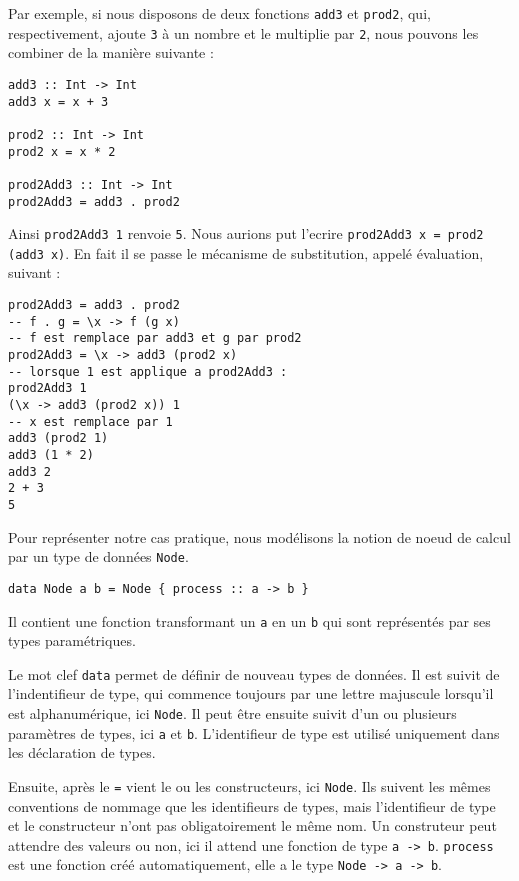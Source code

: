 \documentclass{llncs}
\begin{document}
Par exemple, si nous disposons de deux fonctions \lstinline{add3} et \lstinline{prod2},
qui, respectivement, ajoute \lstinline{3} à un nombre et le multiplie par \lstinline{2},
nous pouvons les combiner de la manière suivante :
\begin{lstlisting}
add3 :: Int -> Int
add3 x = x + 3

prod2 :: Int -> Int
prod2 x = x * 2

prod2Add3 :: Int -> Int
prod2Add3 = add3 . prod2
\end{lstlisting}

Ainsi \lstinline{prod2Add3 1} renvoie \lstinline{5}.
Nous aurions put l'ecrire \lstinline{prod2Add3 x = prod2 (add3 x)}.
En fait il se passe le mécanisme de substitution, appelé évaluation, suivant :
\begin{lstlisting}
prod2Add3 = add3 . prod2
-- f . g = \x -> f (g x)
-- f est remplace par add3 et g par prod2
prod2Add3 = \x -> add3 (prod2 x)
-- lorsque 1 est applique a prod2Add3 :
prod2Add3 1
(\x -> add3 (prod2 x)) 1
-- x est remplace par 1
add3 (prod2 1)
add3 (1 * 2)
add3 2
2 + 3
5
\end{lstlisting}

Pour représenter notre cas pratique, nous modélisons la notion de noeud de calcul
par un type de données \lstinline{Node}.
\begin{lstlisting}
data Node a b = Node { process :: a -> b }
\end{lstlisting}

Il contient une fonction transformant un \lstinline{a} en un \lstinline{b} qui
sont représentés par ses types paramétriques.

Le mot clef \lstinline{data} permet de définir de nouveau types de données.
Il est suivit de l'indentifieur de type, qui commence toujours par une lettre
majuscule lorsqu'il est alphanumérique, ici \lstinline{Node}.
Il peut être ensuite suivit d'un ou plusieurs paramètres de types, ici
\lstinline{a} et \lstinline{b}.
L'identifieur de type est utilisé uniquement dans les déclaration de types.

Ensuite, après le \lstinline{=} vient le ou les constructeurs, ici \lstinline{Node}.
Ils suivent les mêmes conventions de nommage que les identifieurs de types, mais
l'identifieur de type et le constructeur n'ont pas obligatoirement le même nom.
Un construteur peut attendre des valeurs ou non, ici il attend une fonction de
type \lstinline{a -> b}.
\lstinline{process} est une fonction créé automatiquement, elle a le type
\lstinline{Node -> a -> b}.
\end{document}
